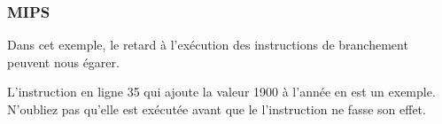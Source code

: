 ﻿\subsubsection{MIPS}



Dans cet exemple, le retard à l'exécution des instructions de branchement peuvent nous égarer.

L'instruction  en ligne 35 qui ajoute la valeur 1900 à l'année en est un 
exemple. N'oubliez pas qu'elle est exécutée avant que le l'instruction  ne fasse son effet.

